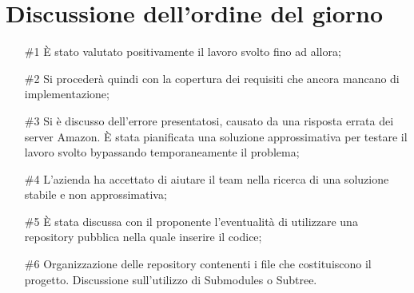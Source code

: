 \documentclass[../verbale-2017-04-20.tex]{subfiles}
\begin{document}
	\section{Discussione dell'ordine del giorno}
	\begin{itemize}
		\item [\#1] È stato valutato positivamente il lavoro svolto fino ad allora;
		\item [\#2] Si procederà quindi con la copertura dei requisiti che ancora mancano di implementazione;
		\item [\#3] Si è discusso dell'errore presentatosi, causato da una risposta errata dei server Amazon. È stata pianificata una soluzione approssimativa per testare il lavoro svolto bypassando temporaneamente il problema;
		\item [\#4] L'azienda ha accettato di aiutare il team nella ricerca di una soluzione stabile e non approssimativa;
		\item [\#5] È stata discussa con il proponente l'eventualità di utilizzare una repository pubblica nella quale inserire il codice;
		\item [\#6] Organizzazione delle repository contenenti i file che costituiscono il progetto. Discussione sull'utilizzo di Submodules o Subtree.
	\end{itemize}
\end{document}
